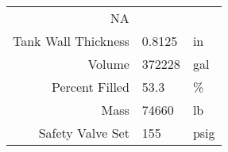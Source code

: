 \documentclass[10pt,parskip=half,
toc=sectionentrywithdots,
bibliography=totocnumbered,
captions=tableheading,numbers=noendperiod]{scrartcl}
\begin{document}
\begin{longtable}[]{@{}rll@{}}
\begin{minipage}[t]{0.23\columnwidth}
NA\strut
\end{minipage}\tabularnewline
\begin{minipage}[t]{0.23\columnwidth}\raggedleft
Tank Wall Thickness\strut
\end{minipage} & \begin{minipage}[t]{0.23\columnwidth}\raggedright
0.8125\strut
\end{minipage} & \begin{minipage}[t]{0.23\columnwidth}\raggedright
in\strut
\end{minipage}\tabularnewline
\begin{minipage}[t]{0.23\columnwidth}\raggedleft
Volume\strut
\end{minipage} & \begin{minipage}[t]{0.23\columnwidth}\raggedright
372228\strut
\end{minipage} & \begin{minipage}[t]{0.23\columnwidth}\raggedright
gal\strut
\end{minipage}\tabularnewline
\begin{minipage}[t]{0.23\columnwidth}\raggedleft
Percent Filled\strut
\end{minipage} & \begin{minipage}[t]{0.23\columnwidth}\raggedright
53.3\strut
\end{minipage} & \begin{minipage}[t]{0.23\columnwidth}\raggedright
\%\strut
\end{minipage}\tabularnewline
\begin{minipage}[t]{0.23\columnwidth}\raggedleft
Mass\strut
\end{minipage} & \begin{minipage}[t]{0.23\columnwidth}\raggedright
74660\strut
\end{minipage} & \begin{minipage}[t]{0.23\columnwidth}\raggedright
lb\strut
\end{minipage}\tabularnewline
\begin{minipage}[t]{0.23\columnwidth}\raggedleft
Safety Valve Set\strut
\end{minipage} & \begin{minipage}[t]{0.23\columnwidth}\raggedright
155\strut
\end{minipage} & \begin{minipage}[t]{0.23\columnwidth}\raggedright
psig\strut
\end{minipage}\tabularnewline
\bottomrule
\end{longtable}
\end{document}

